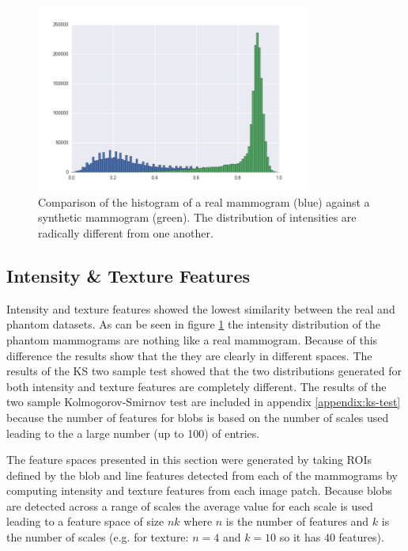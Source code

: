 \begin{figure}[H]
	\label{fig:mammogram-histogram}
	\centering
	\includegraphics[width=0.8\textwidth]{Images/inverted_hist.png}	
	\caption{Comparison of the histogram of a real mammogram (blue) against a synthetic mammogram (green). The distribution of intensities are radically different from one another.}
\end{figure}

\subsection{Intensity \& Texture Features}
\label{subsec:results-texture}
Intensity and texture features showed the lowest similarity between the real and phantom datasets. As can be seen in figure \ref{fig:mammogram-histogram} the intensity distribution of the phantom mammograms are nothing like a real mammogram. Because of this difference the results show that the they are clearly in different spaces. The results of the KS two sample test showed that the two distributions generated for both intensity and texture features are completely different. The results of the two sample Kolmogorov-Smirnov test are included in appendix \ref{appendix:ks-test} because the number of features for blobs is based on the number of scales used leading to the a large number (up to 100) of entries. 

The feature spaces presented in this section were generated by taking ROIs defined by the blob and line features detected from each of the mammograms by computing intensity and texture features from each image patch. Because blobs are detected across a range of scales the average value for each scale is used leading to a feature space of size $nk$ where $n$ is the number of features and $k$ is the number of scales (e.g. for texture: $n = 4$ and $k = 10$ so it has $40$ features). 


